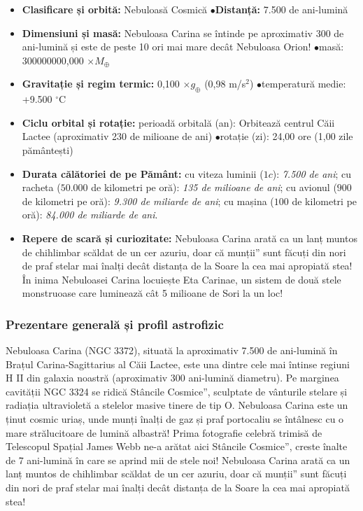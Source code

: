 \begin{tcolorbox}[orbitardata, title={\textbf{Repere esențiale: Nebuloasa Carina (\quotedblbase{}Stâncile Cosmice\textquotedblright{}, NGC 3372)}}]
\small
\begin{itemize}[leftmargin=1.4em, itemsep=2pt, topsep=2pt]
  \item \textbf{Clasificare și orbită:} Nebuloasă Cosmică \quad$\bullet$\quad \textbf{Distanță:} 7.500 de ani-lumină
  \item \textbf{Dimensiuni și masă:} Nebuloasa Carina se întinde pe aproximativ 300 de ani-lumină și este de peste 10 ori mai mare decât Nebuloasa Orion! \quad$\bullet$\quad masă: 300000000,000 $\times M_\oplus$
  \item \textbf{Gravitație și regim termic:} 0,100 $\times g_\oplus$ (0,98 m/s$^2$) \quad$\bullet$\quad temperatură medie: +9.500 $^\circ$C
  \item \textbf{Ciclu orbital și rotație:} perioadă orbitală (an): Orbitează centrul Căii Lactee (aproximativ 230 de milioane de ani) \quad$\bullet$\quad rotație (zi): 24,00 ore (1,00 zile pământești)
  \item \textbf{Durata călătoriei de pe Pământ:} cu viteza luminii ($1c$): \emph{7.500 de ani}; cu racheta ($50.000$ de kilometri pe oră): \emph{135 de milioane de ani}; cu avionul ($900$ de kilometri pe oră): \emph{9.300 de miliarde de ani}; cu mașina ($100$ de kilometri pe oră): \emph{84.000 de miliarde de ani}.
  \item \textbf{Repere de scară și curiozitate:} Nebuloasa Carina arată ca un lanț muntos de chihlimbar scăldat de un cer azuriu, doar că \quotedblbase{}munții\textquotedblright{} sunt făcuți din nori de praf stelar mai înalți decât distanța de la Soare la cea mai apropiată stea! În inima Nebuloasei Carina locuiește Eta Carinae, un sistem de două stele monstruoase care luminează cât 5 milioane de Sori la un loc!
\end{itemize}
\end{tcolorbox}

\subsubsection*{Prezentare generală și profil astrofizic}
Nebuloasa Carina (NGC 3372), situată la aproximativ 7.500 de ani-lumină în Brațul Carina-Sagittarius al Căii Lactee, este una dintre cele mai întinse regiuni H II din galaxia noastră (aproximativ 300 ani-lumină diametru). Pe marginea cavității NGC 3324 se ridică \quotedblbase{}Stâncile Cosmice\textquotedblright{}, sculptate de vânturile stelare și radiația ultravioletă a stelelor masive tinere de tip O. Nebuloasa Carina este un ținut cosmic uriaș, unde munți înalți de gaz și praf portocaliu se întâlnesc cu o mare strălucitoare de lumină albastră! Prima fotografie celebră trimisă de Telescopul Spațial James Webb ne-a arătat aici \quotedblbase{}Stâncile Cosmice\textquotedblright{}, creste înalte de 7 ani-lumină în care se aprind mii de stele noi! Nebuloasa Carina arată ca un lanț muntos de chihlimbar scăldat de un cer azuriu, doar că \quotedblbase{}munții\textquotedblright{} sunt făcuți din nori de praf stelar mai înalți decât distanța de la Soare la cea mai apropiată stea!

